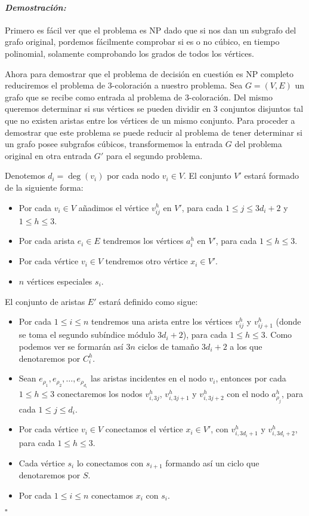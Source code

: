 \documentclass[10pt]{amsart}
\theoremstyle{definition}
\numberwithin{equation}{section}
\newenvironment{myproof} {\paragraph{\emph{Demostraci\'on:}}}{\hfill$\square$}
\begin{document}
\begin{myproof}
	Primero es f\'acil ver que el problema es NP dado que si nos dan un subgrafo del grafo original, pordemos f\'acilmente comprobar si es o no c\'ubico, en tiempo polinomial, solamente comprobando los grados de todos los v\'ertices.
	
	Ahora para demostrar que el problema de decisi\'on en cuesti\'on es NP completo reduciremos el problema de $3$-coloraci\'on a nuestro problema. Sea $G = (V,E)$ un grafo que se recibe como entrada al problema de $3$-coloraci\'on. Del mismo queremos determinar si sus v\'ertices se pueden dividir en $3$ conjuntos disjuntos tal que no existen aristas entre los v\'ertices de un mismo conjunto. Para proceder a demostrar que este problema se puede reducir al problema de tener determinar si un grafo posee subgrafos c\'ubicos, transformemos la entrada $G$ del problema original en otra entrada $G'$ para el segundo problema. 
	
	Denotemos $d_i = \deg(v_i)$ por cada nodo $v_i \in V$. El conjunto $V'$ estar\'a formado de la siguiente forma:
	\begin{itemize}
		\item Por cada $v_i \in V$ a\~nadimos el v\'ertice $v_{ij}^h$ en $V'$, para cada $1 \le j \le 3d_i + 2$ y $1 \le h \le 3$.
		\item Por cada arista $e_i \in E$ tendremos los  v\'ertices $a_i^h$ en $V'$, para cada $1 \le h \le 3$.
		\item Por cada v\'ertice $v_i \in V$ tendremos otro v\'ertice $x_i \in V'$.
		\item $n$ v\'ertices especiales $s_i$.
	\end{itemize}

	El conjunto de aristas $E'$ estar\'a definido como sigue:
	\begin{itemize}
		\item Por cada $1 \le i \le n$ tendremos una arista entre los v\'ertices $v_{ij}^h$ y $v_{ij+1}^h$ (donde se toma el segundo sub\'indice m\'odulo $3d_i + 2$), para cada $1 \le h \le 3$. Como podemos ver se formar\'an as\'i $3n$ ciclos de tama\~no $3d_i + 2$ a los que denotaremos por $C_i^h$.
		\item Sean $e_{\rho_1}, e_{\rho_2}, \dots , e_{\rho_{d_i}}$ las aristas incidentes en el nodo $v_i$,  entonces por cada  $1 \le h \le 3$ conectaremos los nodos $v_{i,3j}^h$, $v_{i,3j + 1}^h$ y $v_{i,3j + 2}^h$ con el nodo  $a_{\rho_j}^h$, para cada $1 \le j \le d_i$.
		\item Por cada v\'ertice $v_i \in V$ conectamos el v\'ertice $x_i \in V'$, con $v_{i,3d_i + 1}^h$ y  $v_{i,3d_i + 2}^h$, para cada $1 \le h \le 3$.
		\item Cada v\'ertice $s_i$ lo conectamos con $s_{i+1}$ formando as\'i un ciclo que denotaremos por $S$.
		\item Por cada $1 \le i \le n$ conectamos $x_i$ con $s_i$. 
	\end{itemize}


\end{myproof}
\end{document}
